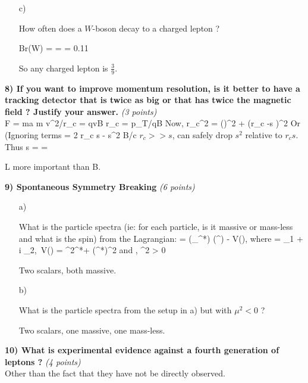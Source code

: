 {\begin{itemize}
{So any charged lepton is $\frac{3}{21}$

}
\item[c)]{How often does a $W$-boson decay to a charged lepton ?

\be
Br(W\rightarrow \ell \nu)  =  =  = 0.11
\ee

So any charged lepton is $\frac{3}{9}$.

}
\end{itemize}


\textbf{8) If you want to improve momentum resolution, is it better to have a tracking detector that is twice as big or that has twice the magnetic field ?  Justify your answer.} \hfill \textit{(3 points)}\\

\be
F = ma \Rightarrow m v^2/r_c = qvB  \Rightarrow r_c = p_T/qB
\ee
Now,
\be
r_c^2 = \left(\right)^2 + (r_c -s )^2
\ee
Or (Ignoring terms 
\be
{} = 2 r_c s - s^2
\ee
B/c $r_c >> s$, can safely drop $s^2$ relative to $r_c s$.  Thus
\be
s =  = 
\ee

L more important than B.


\textbf{9) Spontaneous Symmetry Breaking  } \hfill \textit{(6 points)}\\
\begin{itemize}
\item[a)]{ What is the particle spectra (ie: for each particle, is it massive or mass-less and what is the spin) from the Lagrangian: \be{} = (\partial_\mu \phi^*) (\partial^\mu \phi) - V(\phi), \textrm{ where } \phi = \phi_1 + i \phi_2,\  V(\phi) = \mu^2\phi^*\phi + \lambda (\phi^*\phi)^2\textrm { and } \lambda, \mu^2 > 0   \ee

\bc
Two scalars, both massive.
\ec

}
\item[b)]{ What is the particle spectra from the setup in a) but with $\mu^2 < 0$ ?

\bc
Two scalars, one massive, one mass-less.  
\ec

}
\end{itemize}


\textbf{10) What is experimental evidence against a fourth generation of leptons ? } \hfill \textit{(4 points)}\\
Other than the fact that they have not be directly observed.

}
